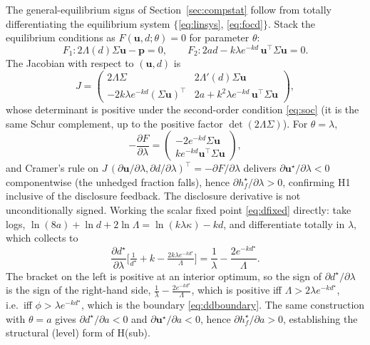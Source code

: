\documentclass[11pt,a4paper]{article}
\begin{document}
The general-equilibrium signs of Section~\ref{sec:compstat} follow from totally differentiating the equilibrium system $\{$\eqref{eq:linsys}, \eqref{eq:focd}$\}$. Stack the equilibrium conditions as $F(\mathbf u,d;\theta)=0$ for parameter $\theta$:
\begin{equation}
F_1: 2\Lambda(d)\Sigma\mathbf u-\mathbf p=0,\qquad F_2: 2ad-k\lambda e^{-kd}\,\mathbf u^\top\Sigma\mathbf u=0.
\end{equation}
The Jacobian with respect to $(\mathbf u,d)$ is
\begin{equation}
J=\begin{pmatrix} 2\Lambda\Sigma & 2\Lambda'(d)\Sigma\mathbf u\\[2pt] -2k\lambda e^{-kd}(\Sigma\mathbf u)^\top & 2a+k^2\lambda e^{-kd}\,\mathbf u^\top\Sigma\mathbf u\end{pmatrix},
\end{equation}
whose determinant is positive under the second-order condition \eqref{eq:soc} (it is the same Schur complement, up to the positive factor $\det(2\Lambda\Sigma)$). For $\theta=\lambda$,
\begin{equation}
-\frac{\partial F}{\partial\lambda}=\begin{pmatrix} -2e^{-kd}\Sigma\mathbf u\\ k e^{-kd}\mathbf u^\top\Sigma\mathbf u\end{pmatrix},
\end{equation}
and Cramer's rule on $J\,(\partial\mathbf u/\partial\lambda,\partial d/\partial\lambda)^\top=-\partial F/\partial\lambda$ delivers $\partial\mathbf u^\star/\partial\lambda<0$ componentwise (the unhedged fraction falls), hence $\partial h_f^\star/\partial\lambda>0$, confirming H1 inclusive of the disclosure feedback. The disclosure derivative is not unconditionally signed. Working the scalar fixed point \eqref{eq:dfixed} directly: take logs, $\ln(8a)+\ln d+2\ln\Lambda=\ln(k\lambda\kappa)-kd$, and differentiate totally in $\lambda$, which collects to
\begin{equation}
\frac{\partial d^\star}{\partial\lambda}\Big[\tfrac{1}{d^\star}+k-\tfrac{2k\lambda e^{-kd^\star}}{\Lambda}\Big]=\frac{1}{\lambda}-\frac{2e^{-kd^\star}}{\Lambda}.
\end{equation}
The bracket on the left is positive at an interior optimum, so the sign of $\partial d^\star/\partial\lambda$ is the sign of the right-hand side, $\tfrac{1}{\lambda}-\tfrac{2e^{-kd^\star}}{\Lambda}$, which is positive iff $\Lambda>2\lambda e^{-kd^\star}$, i.e.\ iff $\phi>\lambda e^{-kd^\star}$, which is the boundary \eqref{eq:ddboundary}. The same construction with $\theta=a$ gives $\partial d^\star/\partial a<0$ and $\partial\mathbf u^\star/\partial a<0$, hence $\partial h_f^\star/\partial a>0$, establishing the structural (level) form of H(sub).
\end{document}
